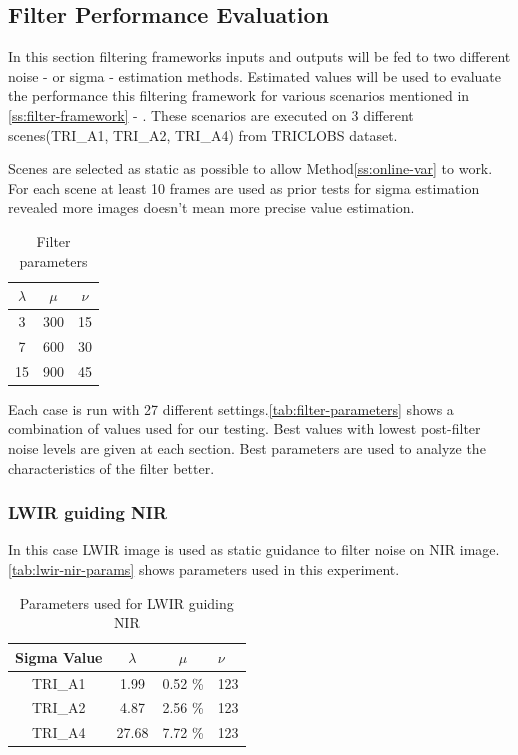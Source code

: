 \documentclass[10pt,twocolumn,letterpaper]{article}
\begin{document}
\subsection{Filter Performance Evaluation}
In this section filtering frameworks inputs and outputs will be fed to two different noise - or sigma - estimation methods. Estimated values will be used to evaluate the performance this filtering framework for various scenarios mentioned in  \ref{ss:filter-framework} -  . These scenarios are executed on 3 different scenes(TRI\_A1, TRI\_A2, TRI\_A4) from TRICLOBS\cite{triclobs} dataset. 

Scenes are selected as static as possible to allow Method\ref{ss:online-var} to work. For each scene at least 10 frames are used as prior tests for sigma estimation revealed more images doesn't mean more precise value estimation.
\begin{table}[!h]
	\centering
	\caption{Filter parameters}
	\label{tab:filter-parameters}
	\begin{tabular}{ccc}
		\hline
		\(\lambda\) & \(\mu\) & \(\nu\) \\ \hline
		3           & 300     & 15      \\
		7           & 600     & 30      \\
		15          & 900     & 45      \\ \hline
	\end{tabular}
\end{table}

Each case is run with 27 different settings.\autoref{tab:filter-parameters} shows a combination of values used for our testing. Best values with lowest post-filter noise levels are given at each section.
Best parameters are used to analyze the characteristics of the filter better.
\subsubsection{LWIR guiding NIR}
In this case LWIR image is used as static guidance to filter noise on NIR image. \autoref{tab:lwir-nir-params} shows parameters used in this experiment.
\begin{table}[!ht]
	\centering
	\caption{Parameters used for LWIR guiding NIR}
	\label{tab:lwir-nir-params}
	\begin{tabular}{@{}cccl@{}}
		\toprule
		\bfseries Sigma Value & \(\lambda\) & \(\mu\) & \(\nu\) \\ \midrule
		TRI\_A1               & 1.99        & 0.52 \% & 123       \\
		TRI\_A2               & 4.87        & 2.56 \% & 123        \\
		TRI\_A4               & 27.68       & 7.72 \% & 123        \\ \bottomrule
	\end{tabular}
\end{table}
\end{document}

